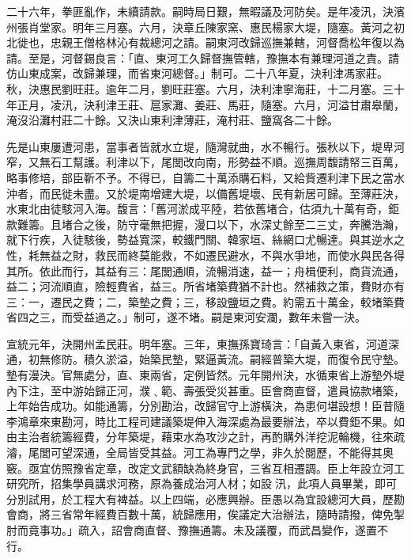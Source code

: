 \begin{pinyinscope}
二十六年，拳匪亂作，未續請款。嗣時局日艱，無暇議及河防矣。是年凌汛，決濱州張肖堂家。明年三月塞。六月，決章丘陳家窯、惠民楊家大堤，隨塞。黃河之初北徙也，忠親王僧格林沁有裁總河之請。嗣東河改歸巡撫兼轄，河督喬松年復以為請。至是，河督錫良言：「直、東河工久歸督撫管轄，豫撫本有兼理河道之責。請仿山東成案，改歸兼理，而省東河總督。」制可。二十八年夏，決利津馮家莊。秋，決惠民劉旺莊。逾年二月，劉旺莊塞。六月，決利津寧海莊，十二月塞。三十年正月，凌汛，決利津王莊、扈家灘、姜莊、馬莊，隨塞。六月，河溢甘肅皋蘭，淹沒沿灘村莊二十餘。又決山東利津薄莊，淹村莊、鹽窩各二十餘。

先是山東屢遭河患，當事者皆就水立堤，隨灣就曲，水不暢行。張秋以下，堤卑河窄，又無石工幫護。利津以下，尾閭改向南，形勢益不順。巡撫周馥請帑三百萬，略事修培，部臣靳不予。不得已，自籌二十萬添購石料，又給貲遷利津下民之當水沖者，而民徙未盡。又於堤南增建大堤，以備舊堤壞、民有新居可歸。至薄莊決，水東北由徒駭河入海。馥言：「舊河淤成平陸，若依舊堵合，估須九十萬有奇，鉅款難籌。且堵合之後，防守毫無把握，漫口以下，水深丈餘至二三丈，奔騰浩瀚，就下行疾，入徒駭後，勢益寬深，較鐵門關、韓家垣、絲網口尤暢達。與其逆水之性，耗無益之財，救民而終莫能救，不如遷民避水，不與水爭地，而使水與民各得其所。依此而行，其益有三：尾閭通順，流暢消速，益一；舟楫便利，商貨流通，益二；河流順直，險輕費省，益三。所省堵築費猶不計也。然補救之策，費財亦有三：一，遷民之費；二，築墊之費；三，移設鹽垣之費。約需五十萬金，較堵築費省四之三，而受益過之。」制可，遂不堵。嗣是東河安瀾，數年未嘗一決。

宣統元年，決開州孟民莊。明年塞。三年，東撫孫寶琦言：「自黃入東省，河道深通，初無修防。積久淤溢，始築民墊，緊逼黃流。嗣經普築大堤，而復令民守墊。墊有漫決。官無處分，直、東兩省，定例皆然。元年開州決，水循東省上游墊外堤內下注，至中游始歸正河，濮﹑範、壽張受災甚重。臣會商直督，遣員協款堵築，上年始告成功。如能通籌，分別勘治，改歸官守上游橫決，為患何堪設想！臣昔隨李鴻章來東勘河，時比工程司建議築堤伸入海深處為最要辦法，卒以費鉅不果。如由主治者統籌經費，分年築堤，藉束水為攻沙之計，再酌購外洋挖泥輪機，往來疏濬，尾閭可望深通，全局皆受其益。河工為專門之學，非久於閱歷，不能得其奧竅。亟宜仿照豫省定章，改定文武額缺為終身官，三省互相遷調。臣上年設立河工研究所，招集學員講求河務，原為養成治河人材；如設汛，此項人員畢業，即可分別試用，於工程大有裨益。以上四端，必應興辦。臣愚以為宜設總河大員，歷勘會商，將三省常年經費百數十萬，統歸應用，俟議定大治辦法，隨時請撥，俾免掣肘而竟事功。」疏入，詔會商直督、豫撫通籌。未及議覆，而武昌變作，遂置不行。


\end{pinyinscope}